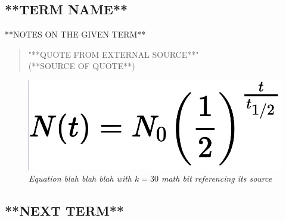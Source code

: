 \documentclass[]{article}
\begin{document}
    \begin{multicols*}{2}

        \subsection{**TERM NAME**}


            **NOTES ON THE GIVEN TERM**
            
            \begin{quote}
                "**QUOTE FROM EXTERNAL SOURCE**" \\ 
                \hspace*{\fill} (**SOURCE OF QUOTE**)
            \end{quote}
            
            \begin{figure}[H]
                \begin{center}
                    \includegraphics[width=\linewidth]{Diagrams/photoOfFormula.png}
                \end{center}
                \caption{\textit{Equation blah blah blah with $k=30$ math bit referencing its source \cite{hofstadter1976energy}}}
                \label{fig:hofButterfly}
            \end{figure}

        \subsection{**NEXT TERM**}
        

    \end{multicols*}
\end{document}

